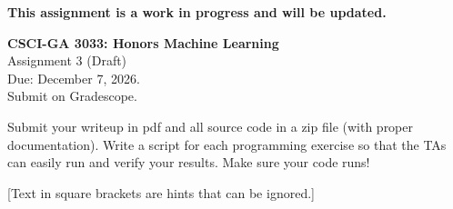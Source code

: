\documentclass[10pt,letterpaper]{article}
\newcommand{\red}[1]{{\color{red}#1}}
\begin{document}
\begin{center}
\red{\textbf{This assignment is a work in progress and will be updated.}}
\end{center}
\begin{center}
\large{\textbf{CSCI-GA 3033: Honors Machine Learning} \\ Assignment 3 (Draft)\\ Due: December 7, 2026.\\ Submit on Gradescope.}
\end{center}
\begin{center}
Submit your writeup in pdf and all source code in a zip file (with proper documentation). Write a script for each programming exercise so that the TAs can easily run and verify your results. Make sure your code runs!

[Text in square brackets are hints that can be ignored.]
\end{center}
\end{document}
